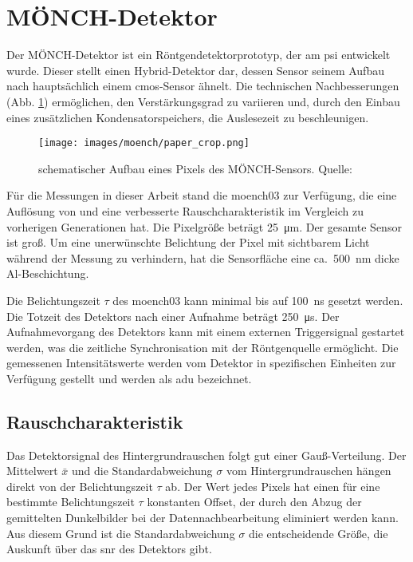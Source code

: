 \section{MÖNCH-Detektor}
\label{text:moench_theorie}
Der MÖNCH-Detektor ist ein Röntgendetektorprototyp, der am \gls{psi} entwickelt wurde. Dieser stellt einen Hybrid-Detektor dar, dessen Sensor seinem Aufbau nach hauptsächlich einem \gls{cmos}-Sensor ähnelt. Die technischen Nachbesserungen (Abb. \ref{fig:moench_pixel}) ermöglichen, den Verstärkungsgrad zu variieren und, durch den Einbau eines zusätzlichen Kondensatorspeichers, die Auslesezeit zu beschleunigen.
\begin{figure}[H]
    \centering
    \texttt{[image: images/moench/paper\_crop.png]}
    \caption{schematischer Aufbau eines Pixels des MÖNCH-Sensors. Quelle: \cite{dinapoli_monch_2014}}
    \label{fig:moench_pixel}
\end{figure}
\noindent
Für die Messungen in dieser Arbeit stand die \gls{moench03} zur Verfügung, die eine Auflösung von  und eine verbesserte Rauschcharakteristik im Vergleich zu vorherigen Generationen hat. Die Pixelgröße beträgt \SI{25}{\micro\meter}. Der gesamte Sensor ist  groß. Um eine unerwünschte Belichtung der Pixel mit sichtbarem Licht während der Messung zu verhindern, hat die Sensorfläche eine ca.\ \SI{500}{\nano\meter} dicke Al-Beschichtung.

\noindent
Die Belichtungszeit $\tau$ des \gls{moench03} kann minimal bis auf \SI{100}{\nano\second} gesetzt werden. Die Totzeit des Detektors nach einer Aufnahme beträgt \SI{250}{\micro\second}. Der Aufnahmevorgang des Detektors kann mit einem externen Triggersignal gestartet werden, was die zeitliche Synchronisation mit der Röntgenquelle ermöglicht. Die gemessenen Intensitätswerte werden vom Detektor in spezifischen Einheiten zur Verfügung gestellt und werden als \gls{adu} bezeichnet.

\subsection{Rauschcharakteristik}
Das Detektorsignal des Hintergrundrauschen folgt gut einer Gauß-Verteilung. Der Mittelwert $\bar{x}$ und die Standardabweichung $\sigma$ vom Hintergrundrauschen hängen direkt von der Belichtungszeit $\tau$ ab. Der Wert jedes Pixels hat einen für eine bestimmte Belichtungszeit $\tau$ konstanten Offset, der durch den Abzug der gemittelten Dunkelbilder bei der Datennachbearbeitung eliminiert werden kann. Aus diesem Grund ist die Standardabweichung $\sigma$ die entscheidende Größe, die Auskunft über das \gls{snr} des Detektors gibt.

